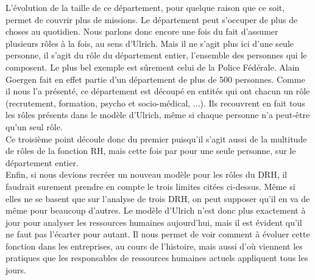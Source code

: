 L'évolution de la taille de ce département, pour quelque raison que ce soit, permet de couvrir plus de missions. Le département peut s'occuper de plus de choses au quotidien. Nous parlons donc encore une fois du fait d'assumer plusieurs rôles à la fois, au sens d'Ulrich. Mais il ne s'agit plus ici d'une seule personne, il s'agit du rôle du département entier, l'ensemble des personnes qui le composent. Le plus bel exemple est sûrement celui de la Police Fédérale. Alain Goergen fait en effet partie d'un département de plus de 500 personnes. Comme il nous l'a présenté, ce département est découpé en entités qui ont chacun un rôle (recrutement, formation, psycho et socio-médical, ...). Ils recouvrent en fait tous les rôles présents dans le modèle d'Ulrich, même si chaque personne n'a peut-être qu'un seul rôle. \\

Ce troisième point découle donc du premier puisqu'il s'agit aussi de la multitude de rôles de la fonction RH, mais cette fois par pour une seule personne, sur le département entier. \\





Enfin, si nous devions recréer un nouveau modèle pour les rôles du DRH, il faudrait surement prendre en compte le trois limites citées ci-dessus. Même si elles ne se basent que sur l'analyse de trois DRH, on peut supposer qu'il en va de même pour beaucoup d'autres. Le modèle d'Ulrich n'est donc plus exactement à jour pour analyser les ressources humaines aujourd'hui, mais il est évident qu'il ne faut pas l'écarter pour autant. Il nous permet de voir comment à évoluer cette fonction dans les entreprises, au cours de l'histoire, mais aussi d'où viennent les pratiques que les responsables de ressources humaines actuels appliquent tous les jours. \\
